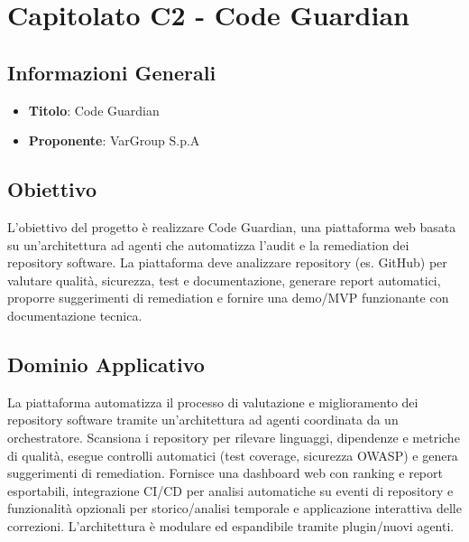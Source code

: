 \documentclass[a4paper,12pt]{article}
\begin{document}
    \section{Capitolato C2 - Code Guardian}
    \subsection{Informazioni Generali}
        \begin{itemize}
            \item \textbf{Titolo}: Code Guardian
            \item \textbf{Proponente}: VarGroup S.p.A
        \end{itemize}
    \subsection{Obiettivo}
    L’obiettivo del progetto è realizzare Code Guardian, una piattaforma web basata su un’architettura ad agenti che automatizza l’audit e la remediation dei repository software. La piattaforma deve analizzare repository (es. GitHub) per valutare qualità, sicurezza, test e documentazione, generare report automatici, proporre suggerimenti di remediation e fornire una demo/MVP funzionante con documentazione tecnica.
    \subsection{Dominio Applicativo}
    La piattaforma automatizza il processo di valutazione e miglioramento dei repository software tramite un’architettura ad agenti coordinata da un orchestratore. Scansiona i repository per rilevare linguaggi, dipendenze e metriche di qualità, esegue controlli automatici (test coverage, sicurezza OWASP) e genera suggerimenti di remediation. Fornisce una dashboard web con ranking e report esportabili, integrazione CI/CD per analisi automatiche su eventi di repository e funzionalità opzionali per storico/analisi temporale e applicazione interattiva delle correzioni. L’architettura è modulare ed espandibile tramite plugin/nuovi agenti.\\
\end{document}
